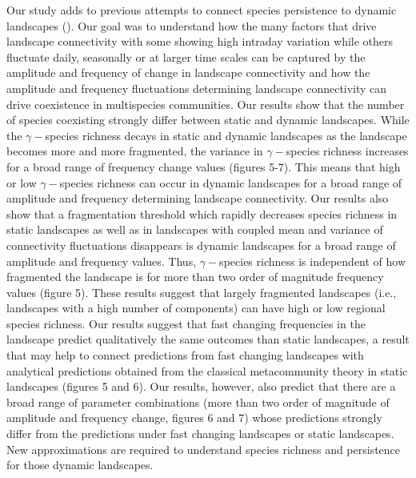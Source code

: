 \documentclass[12pt]{article}
\begin{document}
Our study adds to previous attempts to connect species persistence to dynamic landscapes (\cite{Hanski1999,keymeretal2000}). Our goal was to understand how the many factors that drive landscape connectivity with some showing high intraday variation while others fluctuate daily, seasonally or at larger time scales can be captured by the amplitude and frequency of change in landscape connectivity and how the amplitude and frequency fluctuations determining landscape connectivity can drive coexistence in multispecies communities. Our results show that the number of species coexisting strongly differ between static and dynamic landscapes. While the $\gamma-$species richness decays in static and dynamic landscapes as the landscape becomes more and more fragmented, the variance in $\gamma-$species richness increases for a broad range of frequency change values (figures 5-7). This means that high or low $\gamma-$species richness can occur in dynamic landscapes for a broad range of amplitude and frequency determining landscape connectivity. Our results also show that a fragmentation threshold which rapidly decreases species richness in static landscapes as well as in landscapes with coupled mean and variance of connectivity fluctuations disappears is dynamic landscapes for a broad range of amplitude and frequency values. Thus,  $\gamma-$species richness is independent of how fragmented the landscape is for more than two order of magnitude frequency values (figure 5). These results suggest that largely fragmented landscapes (i.e., landscapes with a high number of components) can have high or low regional species richness. Our results suggest that fast changing frequencies in the landscape predict qualitatively the same outcomes than static landscapes, a result that may help to connect predictions from fast changing landscapes with analytical predictions obtained from the classical metacommunity theory in static landscapes (figures 5 and 6). Our results, however, also predict that there are a broad range of parameter combinations (more than two order of magnitude of amplitude and frequency change, figures 6 and 7) whose predictions strongly differ from the predictions under fast changing landscapes or static landscapes. New approximations are required to understand species richness and persistence for those dynamic landscapes. 
\end{document}
